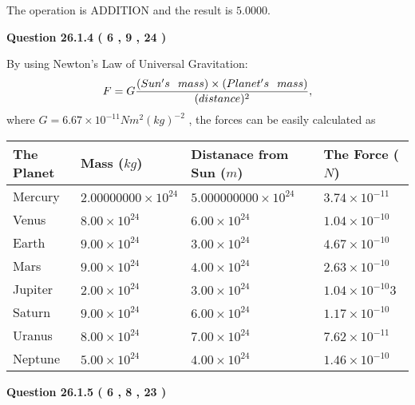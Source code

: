 \documentclass[12pt]{article}
\begin{document}
The operation is  %
ADDITION and the result is
$ %
5.0000$.
 
  
  
{\textbf{\large{Question
26.1.4 
 (           6 ,           9 ,          24 )
}}}

By using Newton's Law of Universal Gravitation:
\[
F=G \frac{(Sun's \hspace{0.1in} mass) \times (Planet's \hspace{0.1in} mass)} { (distance)^2},
\]
where
$ G= %
6.67 \times 10^{-11} N m^{2}(kg)^{-2}$ , the forces can be easily calculated as
 
\vspace{0.2in}
 
 
\begin{tabular}{|l|l|l|l|}
\hline
The Planet & Mass ($kg$) & Distanace from Sun ($m$) & The Force ($N$)\\
\hline
Mercury  &
           $ %
2.00000000 \times 10^{24}  $   &
             $ %
5.000000000 \times 10^{24}$    & $ %
3.74 \times 10^{-11} $
\\  \hline
Venus    &
           $  %
8.00 \times 10^{24}  $     &
             $ %
6.00 \times 10^{24} $    & $ %
1.04 \times 10^{-10} $
\\  \hline
Earth    &
           $  %
9.00 \times 10^{24}$     &
             $ %
3.00 \times 10^{24} $    & $ %
4.67 \times 10^{-10} $
\\   \hline
Mars     &
           $  %
9.00 \times 10^{24} $     &
             $ %
4.00 \times 10^{24}$    & $ %
2.63 \times 10^{-10} $
\\   \hline
Jupiter  &
           $  %
2.00 \times 10^{24}  $    &
             $ %
3.00 \times 10^{24} $    & $ %
1.04 \times 10^{-10}3 $
\\  \hline
Saturn   &
           $  %
9.00 \times 10^{24}   $    &
             $ %
6.00 \times 10^{24}  $    & $ %
1.17 \times 10^{-10} $
\\  \hline
Uranus   &
           $  %
8.00 \times 10^{24} $    &
             $ %
7.00 \times 10^{24}$    & $ %
7.62 \times 10^{-11} $
\\  \hline
Neptune  &
           $  %
5.00 \times 10^{24}  $    &
             $ %
4.00 \times 10^{24} $    & $ %
1.46 \times 10^{-10} $
\\  \hline
 
\end{tabular}
 
 
  
  
{\textbf{\large{Question
26.1.5 
 (           6 ,           8 ,          23 )
}}}
 
\end{document}
